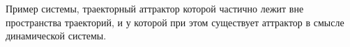 
\LARGE



Пример системы, траекторный аттрактор которой частично лежит вне пространства траекторий,
и у которой при этом существует аттрактор в смысле динамической системы.


